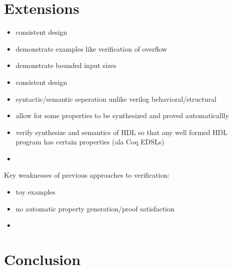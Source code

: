 \documentclass[12pt, titlepage]{article}
\begin{document}
\section{Extensions}

\begin{itemize}
    \item consistent design
    \item demonstrate examples like verification of overflow
    \item demonstrate bounded input sizes
\end{itemize}

\begin{itemize}
    \item consistent design
    \item syntactic/semantic seperation unlike verilog behavioral/structural
    \item allow for some properties to be synthesized and proved automaticallly
    \item verify synthesize and semantics of HDL so that any well formed HDL program has certain properties (ala Coq EDSLs)
    \item {}
\end{itemize}

Key weaknesses of previous approaches to verification:
\begin{itemize}
    \item toy examples
    \item no automatic property generation/proof satisfaction
    \item 
\end{itemize}


\section{Conclusion}




\end{document}

